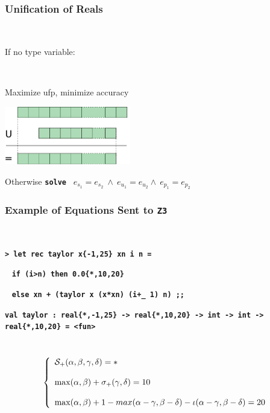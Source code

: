 \documentclass[handout,t]{beamer}
\def\mytt#1{\texttt{\textbf{#1}}}
\def\real#1{real\{#1\}}
\begin{document}
\begin{frame}
\frametitle{Unification of Reals}

~

\vspace{0.3cm}

If no type variable:

~

\centerline{\color{blue}Maximize ufp, minimize accuracy}

\vspace{0.7cm}

\centerline{\includegraphics[width=5.5cm]{unify.pdf}}

\vspace{0.7cm}

Otherwise \mytt{solve} \ $e_{s_1} = e_{s_2}\ \wedge\ e_{u_1} = e_{u_2}\wedge\ e_{p_1} = e_{p_2}$

\end{frame}

\begin{frame}
\frametitle{Example of Equations Sent to \mytt{Z3}}

~


\vspace{0.5cm}


\scriptsize
\color{blue}

%


\mytt{> let rec taylor x{\{-1,25\}} xn i n =}

~ \hspace{1.55cm}\mytt{if (i>n) then 0.0\{*,10,20\} }

~ \hspace{1.55cm}\mytt{else xn + (taylor x (x*xn) (i+\_ 1) n) ;;}
 
\mytt{\color{red}val taylor : \real{*,-1,25} -> \real{*,10,20} -> int -> int -> \real{*,10,20} = <fun>
}

\vspace{.7cm}

\small\
$$\color{black}
\left\{
\begin{array}{l}
\mathcal{S}_+(\alpha, \beta, \gamma, \delta) = *\\
\\
\max( \alpha, \beta) + \sigma_+( \gamma, \delta) = 10\\
\\
 \max( \alpha,\beta ) + 1 - max (\alpha - \gamma,\beta - \delta) - \iota (\alpha -\gamma,\beta - \delta)
=20
\end{array}
\right.
$$

\end{frame}
\end{document}
